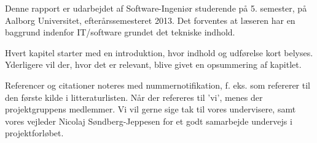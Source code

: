 Denne rapport er udarbejdet af Software-Ingeniør studerende på 5. semester, på Aalborg Universitet, efterårssemesteret 2013.
Det forventes at læseren har en baggrund indenfor IT/software grundet det tekniske indhold.

Hvert kapitel starter med en introduktion, hvor indhold og udførelse kort belyses.
Yderligere vil der, hvor det er relevant, blive givet en opsummering af kapitlet.

Referencer og citationer noteres med nummernotifikation, f. eks. \cite{probabilisticRobotics} som refererer til den første kilde i litteraturlisten.
Når der refereres til 'vi', menes der projektgruppens medlemmer.
\newline
\newline
Vi vil gerne sige tak til vores undervisere, samt vores vejleder Nicolaj Søndberg-Jeppesen for et godt samarbejde undervejs i projektforløbet.